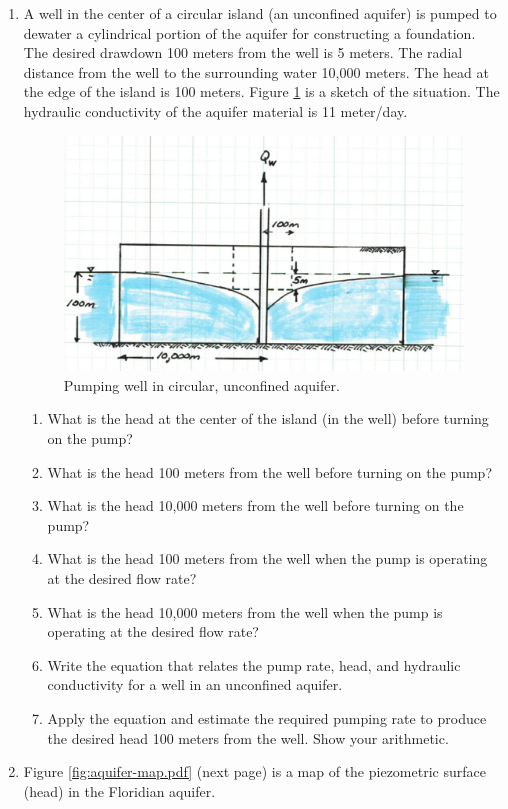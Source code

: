 \documentclass[12pt]{article}
\begin{document}
\begin{enumerate}
\begin{enumerate}
\end{enumerate}
\clearpage
\item A well in the center of a circular island (an unconfined aquifer) is pumped to dewater a cylindrical portion of the aquifer for constructing a foundation.   The desired drawdown 100 meters from the well is 5 meters.   The radial distance from the well to the surrounding water 10,000 meters.  The head at the edge of the island is 100 meters.  Figure \ref{fig:well-in-aquifer.pdf} is a sketch of the situation.   The hydraulic conductivity of the aquifer material is 11 meter/day. 
\begin{figure}[h!] %
   \centering
   \includegraphics[width=5.5in]{well-in-aquifer.pdf} 
   \caption{Pumping well in circular, unconfined aquifer.}
   \label{fig:well-in-aquifer.pdf}
\end{figure}
\begin{enumerate}
\item What is the head at the center of the island (in the well) before turning on the pump?
\item What is the head 100 meters from the well before turning on the pump?
\item What is the head 10,000 meters from the well before turning on the pump?
\item What is the head 100 meters from the well when the pump is operating at the desired flow rate?
\item What is the head 10,000 meters from the well when the pump is operating at the desired flow rate?
\item Write the equation that relates the pump rate, head, and hydraulic conductivity for a well in an unconfined aquifer.
\item Apply the equation and estimate the required pumping rate to produce the desired head 100 meters from the well.   Show your arithmetic.
\end{enumerate}
\clearpage
\item Figure \ref{fig:aquifer-map.pdf} (next page) is a map of the piezometric surface (head) in the Floridian aquifer.  


\end{enumerate}
\end{document}
